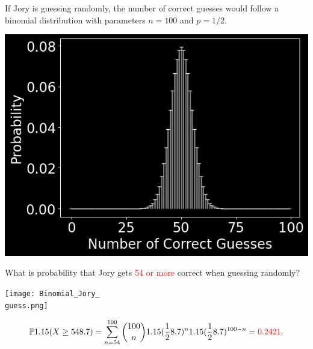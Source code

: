 \begin{frame}[fragile]
 \begin{center}
 If Jory is guessing randomly,  the number of correct guesses would follow a binomial distribution
 with parameters $n=100$ and $p=1/2$.
 \bigskip
 \bigskip

\includegraphics[scale=0.4]{Codes/Binomial_Jory.png}

\end{center}

\end{frame}
\begin{frame}[fragile]
\def\guess{54}
\def\ans{0.2421}
  \begin{center}
    What is probability that Jory gets \textcolor{red}{\guess\: or more} correct when guessing randomly?
 \bigskip
  \pause

 \texttt{[image: Binomial\_Jory\_\\guess.png]}
  \end{center}
\bigskip
\begin{align*}
  \bbP\left(X\ge \guess\right) = \sum_{n=\guess}^{100} \binom{100}{n} \left(\frac{1}{2}\right)^n \left(\frac{1}{2}\right)^{100-n} = \textcolor{red}{\ans}.
\end{align*}
 \end{frame}

